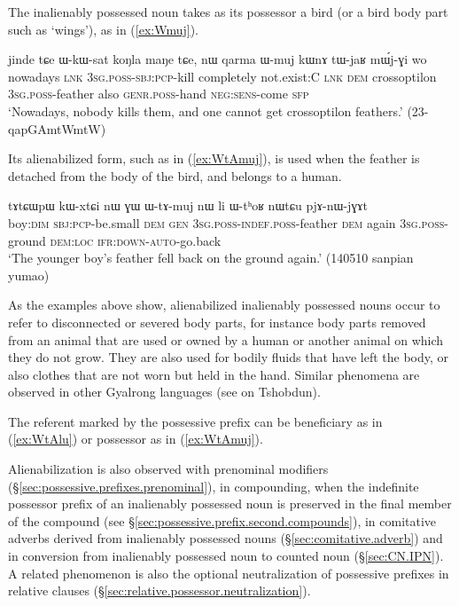 The inalienably possessed noun  takes as its possessor a bird (or a bird body part such as `wings'), as in (\ref{ex:Wmuj}).

  \begin{exe}
\ex \label{ex:Wmuj}
 \gll  jinde tɕe ɯ-kɯ-sat koŋla maŋe tɕe, nɯ qarma ɯ-muj kɯnɤ tɯ-jaʁ mɯ́j-ɣi wo \\
 nowadays \textsc{lnk} \textsc{3sg}.\textsc{poss}-\textsc{sbj}:\textsc{pcp}-kill completely not.exist:C \textsc{lnk} \textsc{dem} crossoptilon \textsc{3sg}.\textsc{poss}-feather also \textsc{genr}.\textsc{poss}-hand \textsc{neg}:\textsc{sens}-come \textsc{sfp} \\
 \glt `Nowadays, nobody kills them, and one cannot get crossoptilon feathers.' (23-qapGAmtWmtW)
 \end{exe}

Its alienabilized form, such as  in (\ref{ex:WtAmuj}), is used when the feather is detached from the body of the bird, and belongs to a human.
 
\begin{exe}
\ex \label{ex:WtAmuj}
 \gll tɤtɕɯpɯ kɯ-xtɕi nɯ ɣɯ ɯ-tɤ-muj nɯ li ɯ-tʰoʁ nɯtɕu pjɤ-nɯ-jɣɤt \\
 boy:\textsc{dim} \textsc{sbj}:\textsc{pcp}-be.small \textsc{dem} \textsc{gen} \textsc{3sg}.\textsc{poss}-\textsc{indef}.\textsc{poss}-feather \textsc{dem} again \textsc{3sg}.\textsc{poss}-ground \textsc{dem}:\textsc{loc} \textsc{ifr}:\textsc{down}-\textsc{auto}-go.back \\
 \glt `The younger boy's feather fell back on the ground again.' (140510 sanpian yumao)
\end{exe}
 
As the examples above show, alienabilized inalienably possessed nouns occur to refer to disconnected or severed body parts, for instance body parts removed from an animal that are used or owned by a human or another animal on which they do not grow. They are also used for bodily fluids that have left the body, or also clothes that are not worn but held in the hand. Similar phenomena are observed in other Gyalrong languages (see \citealt[140]{jackson98morphology} on Tshobdun).

The referent marked by the possessive prefix can be beneficiary as in (\ref{ex:WtAlu}) or possessor as in (\ref{ex:WtAmuj}).
 
Alienabilization is also observed with prenominal modifiers (§\ref{sec:possessive.prefixes.prenominal}), in compounding, when the indefinite possessor prefix of an inalienably possessed noun is preserved in the final member of the compound (see §\ref{sec:possessive.prefix.second.compounds}), in comitative adverbs derived from inalienably possessed nouns (§\ref{sec:comitative.adverb}) and in conversion from inalienably possessed noun to counted noun (§\ref{sec:CN.IPN}). A related phenomenon is also the optional neutralization of possessive prefixes in relative clauses (§\ref{sec:relative.possessor.neutralization}).
 
